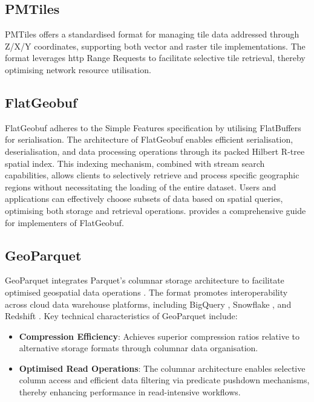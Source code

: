 \subsection{PMTiles}
\label{rw:cloud_optimised_implementations:pmtiles}
PMTiles offers a standardised format for managing tile data addressed through Z/X/Y coordinates, supporting both vector and raster tile implementations. The format leverages \ac{http} Range Requests \citep{http_range_requests} to facilitate selective tile retrieval, thereby optimising network resource utilisation.

\subsection{FlatGeobuf}
\label{rw:cloud_optimised_implementations:flatgeobuf}
FlatGeobuf adheres to the Simple Features \citet{simple_features} specification by utilising FlatBuffers \citep{flatbuffers} for serialisation.
The architecture of FlatGeobuf enables efficient serialisation, deserialisation, and data processing operations through its packed Hilbert R-tree spatial index.
This indexing mechanism, combined with stream search capabilities, allows clients to selectively retrieve and process specific geographic regions without necessitating the loading of the entire dataset.
Users and applications can effectively choose subsets of data based on spatial queries, optimising both storage and retrieval operations.
\citet{horance_2022_detail} provides a comprehensive guide for implementers of FlatGeobuf.

\subsection{GeoParquet}
\label{rw:cloud_optimised_implementations:geoparquet}
GeoParquet integrates Parquet's columnar storage architecture to facilitate optimised geospatial data operations \citep{geoparquet}. The format promotes interoperability across cloud data warehouse platforms, including BigQuery \citep{bigquery}, Snowflake \citep{snowflake}, and Redshift \citep{redshift}. Key technical characteristics of GeoParquet include:

\begin{itemize}
  \item \textbf{Compression Efficiency}: Achieves superior compression ratios relative to alternative storage formats through columnar data organisation.
  \item \textbf{Optimised Read Operations}: The columnar architecture enables selective column access and efficient data filtering via predicate pushdown mechanisms, thereby enhancing performance in read-intensive workflows.
\end{itemize}

